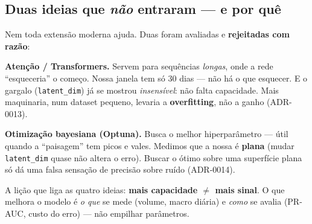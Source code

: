 \subsection{Duas ideias que \emph{não} entraram --- e por quê}
\label{sec:rara-rejeitadas}

Nem toda extensão moderna ajuda. Duas foram avaliadas e \textbf{rejeitadas com razão}:

\begin{intuicao}
\textbf{Atenção / Transformers.} Servem para sequências \emph{longas}, onde a rede ``esqueceria'' o
começo. Nossa janela tem só 30 dias --- não há o que esquecer. E o gargalo (\texttt{latent\_dim}) já se
mostrou \emph{insensível}: não falta capacidade. Mais maquinaria, num dataset pequeno, levaria a
\textbf{overfitting}, não a ganho (ADR-0013).
\end{intuicao}

\begin{intuicao}
\textbf{Otimização bayesiana (Optuna).} Busca o melhor hiperparâmetro --- útil quando a ``paisagem''
tem picos e vales. Medimos que a nossa é \textbf{plana} (mudar \texttt{latent\_dim} quase não altera o
erro). Buscar o ótimo sobre uma superfície plana só dá uma falsa sensação de precisão sobre ruído
(ADR-0014).
\end{intuicao}

\begin{intuicao}
A lição que liga as quatro ideias: \textbf{mais capacidade $\ne$ mais sinal}. O que melhora o modelo é
\emph{o que} se mede (volume, macro diária) e \emph{como} se avalia (PR-AUC, custo do erro) --- não
empilhar parâmetros.
\end{intuicao}
